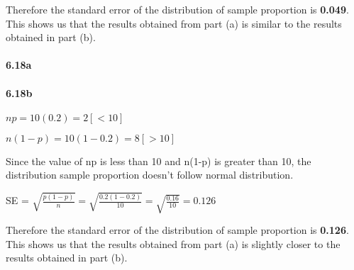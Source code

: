 \documentclass[
]{article}
\begin{document}
Therefore the standard error of the distribution of sample proportion is
\textbf{0.049}. This shows us that the results obtained from part (a) is
similar to the results obtained in part (b).

\hypertarget{a-18}{%
\paragraph{6.18a}\label{a-18}}

\hypertarget{b-18}{%
\paragraph{6.18b}\label{b-18}}

\(np = 10(0.2) = 2 [<10]\)

\(n(1-p) = 10(1-0.2) = 8 [>10]\)

Since the value of np is less than 10 and n(1-p) is greater than 10, the
distribution sample proportion doesn't follow normal distribution.

SE =
\(\sqrt{\frac{p(1-p)}{n}}=\sqrt{\frac{0.2(1-0.2)}{10}}= \sqrt{\frac{0.16}{10}} = 0.126\)

Therefore the standard error of the distribution of sample proportion is
\textbf{0.126}. This shows us that the results obtained from part (a) is
slightly closer to the results obtained in part (b).
\end{document}
